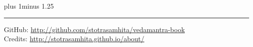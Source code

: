\documentclass[twoside,12pt]{book}
\makeatletter
\renewcommand\chapter{\resetShloka\@startsection {chapter}{1}{\z@}%
{10pt}
{2pt}
{\normalfont\LARGE\bfseries\filcenter}}
\makeatother
\begin{document}
\Large\setmainfont[Script=Devanagari,Mapping=tex-text]{Sanskrit 2003}
\fontsize{18pt}{22pt}\selectfont
\font plus 1\font minus 1.25\font
\setlength{\parindent}{0pt}
\setlength{\emergencystretch}{3em}
\renewcommand{\sect}[1]{\chapter[#1]{॥#1॥}}
\makeatletter
  \def\vhrulefill#1{\leavevmode\leaders\hrule\@height#1\hfill \kern\z@}
\makeatother
{}
\newcommand{\anuvakamend}[1][]{\refstepcounter{anuvakam}%
\newline\ifthenelse{\equal{#1}{}}{\mbox{}}{{\footnotesize #1॥\devanumber{\arabic{anuvakam}}॥}}\vhrulefill{3pt}\bfseries{[\devanumber{\arabic{anuvakam}}]}%
}

\vfill
\hrule
\footnotesize
{}
\textsf{%
\noindent GitHub: \url{http://github.com/stotrasamhita/vedamantra-book}\\[0.7ex]
Credits: \url{http://stotrasamhita.github.io/about/}}
\end{document}
